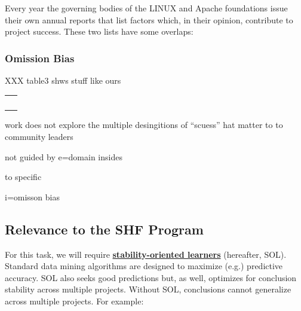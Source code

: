  
 
 Every year the governing bodies of the LINUX and Apache foundations issue their own annual reports that list factors which, in their opinion, contribute to project success. These two lists have some overlaps:
 
 \subsubsection{Omission Bias}
 
 

 
 XXX table3 shws stuff like ours
 
 
 \begin{table}
 \begin{tabular}{c}
 ~
 \end{tabular}
 \end{table}
 
 
 work does not explore the multiple desingitions of ``scuess'' hat matter to to community leaders
 
 not guided by e=domain insides
 
 to specific
 
 i=omisson bias
 
 \subsection{Relevance to the SHF Program}
 
 

For this task, we will require  {\bf \underline{stability-oriented learners}} (hereafter, SOL).
Standard data mining algorithms are designed to maximize (e.g.) predictive accuracy.
SOL also seeks good predictions but, as well, optimizes for conclusion stability across
multiple projects. Without SOL, conclusions cannot generalize across multiple projects.
For example:


